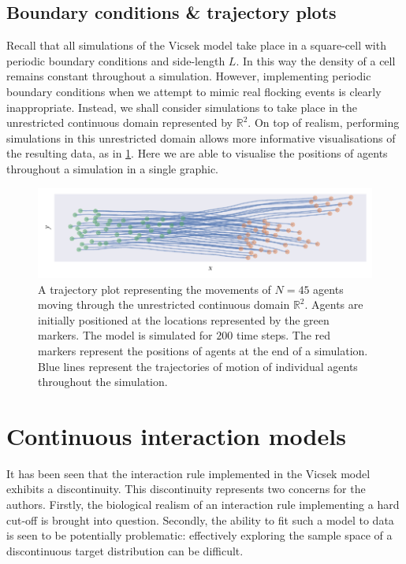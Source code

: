 \subsection{Boundary conditions \& trajectory plots}

Recall that all simulations of the Vicsek model take place in a square-cell with periodic
boundary conditions and side-length $L$. In this way the density of a cell remains
constant throughout a simulation. However, implementing periodic boundary conditions when
we attempt to mimic real flocking events is clearly inappropriate. Instead, we shall
consider simulations to take place in the unrestricted continuous domain represented by
$\mathbb{R}^2$.  On top of realism, performing simulations in this unrestricted domain
allows more informative visualisations of the resulting data, as in
\cref{fig:example_traj}. Here we are able to visualise the positions of agents throughout
a simulation in a single graphic.

\begin{figure}[tb]
    \includegraphics{example_traj_plot.pdf}
    \caption{A trajectory plot representing the movements of $N=45$ agents moving through
        the unrestricted continuous domain $\mathbb{R}^2$. Agents are initially positioned
        at the locations represented by the green markers. The model is simulated for
        $200$ time steps. The red markers represent the positions of agents at the end of
        a simulation. Blue lines represent the trajectories of motion of individual agents
        throughout the simulation.}
    \label{fig:example_traj}
\end{figure}

\section{Continuous interaction models}

It has been seen that the interaction rule implemented in the Vicsek model exhibits a
discontinuity. This discontinuity represents two concerns for the authors. Firstly, the
biological realism of an interaction rule implementing a hard cut-off is brought into
question. Secondly, the ability to fit such a model to data is seen to be potentially
problematic: effectively exploring the sample space of a discontinuous target
distribution can be difficult.

